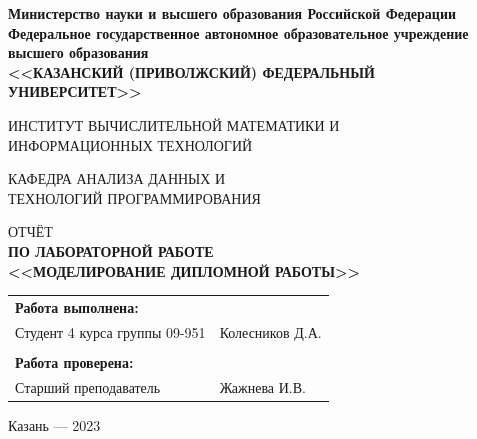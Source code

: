 \documentclass[a4paper, article]{article}
\begin{document}
    \begin{titlepage}
        \begin{center}
            {\bf Министерство науки и высшего образования Российской Федерации \\
            Федеральное государственное автономное образовательное учреждение \\
            высшего образования \\
            <<КАЗАНСКИЙ (ПРИВОЛЖСКИЙ) ФЕДЕРАЛЬНЫЙ УНИВЕРСИТЕТ>>}

            \vspace{2em}

            {ИНСТИТУТ ВЫЧИСЛИТЕЛЬНОЙ МАТЕМАТИКИ И \\
            ИНФОРМАЦИОННЫХ ТЕХНОЛОГИЙ}

            \vspace{2em}

            {КАФЕДРА АНАЛИЗА ДАННЫХ И \\
            ТЕХНОЛОГИЙ ПРОГРАММИРОВАНИЯ}

            \vspace{6em}

            ОТЧЁТ \\
            {\bf ПО ЛАБОРАТОРНОЙ РАБОТЕ \\
            <<МОДЕЛИРОВАНИЕ ДИПЛОМНОЙ РАБОТЫ>>}
        \end{center}

        \vfill

        \begin{xltabular}{\textwidth} {
                >{\hsize} X
                >{\hsize} X }
            \bf{Работа выполнена:} & \\
            Студент 4 курса группы 09-951 & \hspace{2cm}Колесников Д.А.\\
            & \\
            \bf{Работа проверена:} & \\
            Старший преподаватель & \hspace{2cm}Жажнева И.В. \\
        \end{xltabular}

        \vspace{2em}

        \begin{center}
            Казань — 2023
        \end{center}
    \end{titlepage}
\end{document}
